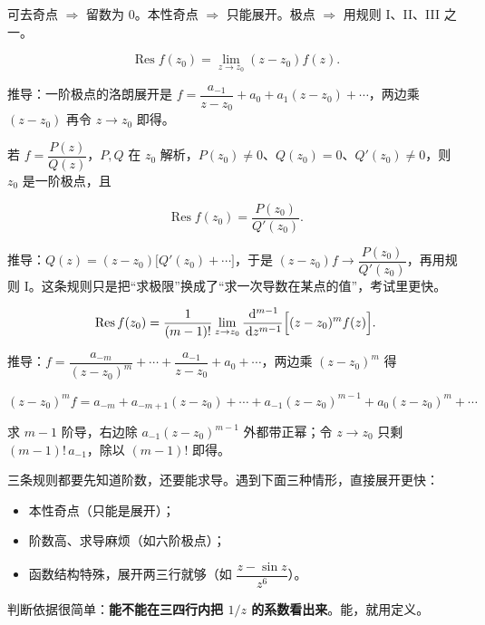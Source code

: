\documentclass[11pt]{ctexart}
\let\origsubhdr\subhdr
\renewcommand{\subhdr}[1]{\par\needspace{4\baselineskip}\origsubhdr{#1}}
\let\orighdr\hdr
\renewcommand{\hdr}[2]{\par\orighdr{#1}{#2}}
\begin{document}


可去奇点 $\Rightarrow$ 留数为 0。本性奇点 $\Rightarrow$ 只能展开。极点 $\Rightarrow$ 用规则 I、II、III 之一。


\[ \operatorname{Res}f(z_0)=\lim_{z\to z_0}(z-z_0)f(z) . \]

推导：一阶极点的洛朗展开是 $f=\dfrac{a_{-1}}{z-z_0}+a_0+a_1(z-z_0)+\cdots$，两边乘 $(z-z_0)$ 再令 $z\to z_0$ 即得。


若 $f=\dfrac{P(z)}{Q(z)}$，$P,Q$ 在 $z_0$ 解析，$P(z_0)\ne0$、$Q(z_0)=0$、$Q'(z_0)\ne0$，则 $z_0$ 是一阶极点，且

\[ \operatorname{Res}f(z_0)=\frac{P(z_0)}{Q'(z_0)} . \]

推导：$Q(z)=(z-z_0)\bigl[Q'(z_0)+\cdots\bigr]$，于是 $(z-z_0)f\to\dfrac{P(z_0)}{Q'(z_0)}$，再用规则 I。这条规则只是把“求极限”换成了“求一次导数在某点的值”，考试里更快。


\[ \operatorname{Res}f(z_0)=\frac{1}{(m-1)!}\lim_{z\to z_0}\frac{\,\mathrm{d}^{m-1}}{\,\mathrm{d} z^{m-1}}\Bigl[(z-z_0)^m f(z)\Bigr] . \]

推导：$f=\dfrac{a_{-m}}{(z-z_0)^m}+\cdots+\dfrac{a_{-1}}{z-z_0}+a_0+\cdots$，两边乘 $(z-z_0)^m$ 得

\[ (z-z_0)^m f=a_{-m}+a_{-m+1}(z-z_0)+\cdots+a_{-1}(z-z_0)^{m-1}+a_0(z-z_0)^m+\cdots \]

求 $m-1$ 阶导，右边除 $a_{-1}(z-z_0)^{m-1}$ 外都带正幂；令 $z\to z_0$ 只剩 $(m-1)!\,a_{-1}$，除以 $(m-1)!$ 即得。


三条规则都要先知道阶数，还要能求导。遇到下面三种情形，直接展开更快：

\begin{itemize}
\item 本性奇点（只能是展开）；
\item 阶数高、求导麻烦（如六阶极点）；
\item 函数结构特殊，展开两三行就够（如 $\dfrac{z-\sin z}{z^6}$）。
\end{itemize}

判断依据很简单：\textbf{能不能在三四行内把 $1/z$ 的系数看出来}。能，就用定义。

\end{document}
